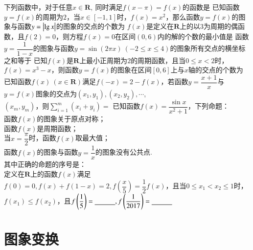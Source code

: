 \documentclass{BHCexam}
\begin{document}
\begin{questions}
\qs 下列函数中，对于任意$ x\in \mathbf{R} ,~$同时满足$f(x-\pi)=f(x)$的函数是\xx
{}
\qs 已知函数$y=f(x)$的周期为$ 2 $，当$ x\in\left[-1,1\right] $时，$ f(x)=x^2 $，那么函数$y=f(x)$的图象与函数$ y=\left| \lg x \right| $的图象的交点的个数为\xx
{} 
\qs $f(x)$是定义在$\mathbf{R}$上的以$ 3 $为周期的偶函数，且$ f(2)=0 $，则方程$ f(x)=0 $在区间$ \left(0,6\right) $内的解的个数的最小值是\xx
{}
\qs 函数$ y=\dfrac{1}{1-x} $的图象与函数$ y=\sin\left(2\pi x\right)~(-2\le x\le 4) $的图象所有交点的横坐标之和等于\xx
{}  
\qs 已知$f(x)$是$\mathbf{R}$上最小正周期为$ 2 $的周期函数，且当$ 0\le x<2 $时，$f(x)=x^3-x$，则函数$ y=f(x) $的图象在区间$ \left[0,6\right] $上与$x$轴的交点的个数为\xx
{}
\qs 已知函数$f(x)~(x\in \mathbf{R})$满足$f(-x)=2-f(x)$，若函数$y=\dfrac{x+1}{x}$与$y=f(x)$图象的交点为$\left(x_1,y_1\right),\left(x_2,y_2\right),\cdots$,\\$\left(x_m,y_m\right)$，则$\sum\limits_{i=1}^{m}(x_i+y_i)=$\xx
{}
\qs 已知函数$f(x)=\dfrac{ \sin x}{x^2+1 }$，下列命题：\\
 函数$f(x)$的图象关于原点对称；\\
 函数$f(x)$是周期函数；\\
 当$ x=\dfrac{\pi}{2} $时，函数$f(x)$取最大值；\\
 函数$f(x)$的图象与函数$ y=\dfrac{1}{x} $的图象没有公共点.\\
其中正确的命题的序号是：\\
\qs 定义在$\mathbf{R}$上的函数$f(x)$满足$ f(0)=0,f(x)+f(1-x)=2,f\left(\dfrac{x}{5}\right)=\dfrac{1}{2} f(x)$，且当$ 0\le x_1<x_2\le1 $时，$ f(x_1)\le f(x_2) $，且$ f\left(\dfrac{1}{5}\right)=\underline{\hspace{3em}},f\left(\dfrac{1}{2017}\right)=\underline{\hspace{3em}} $
\end{questions}
\newpage


\section{图象变换}
\end{document}
